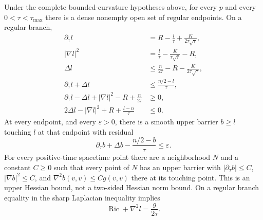 \begin{theorem}
\label{thm:m09-differential}
Under the complete bounded-curvature hypotheses above, for every $p$ and
every $0<\tau<\tau_{\max}$ there is a dense nonempty open
set of regular endpoints.  On a regular branch,
\begin{align*}
 \partial_\tau l&=R-\frac l\tau+\frac K{2\tau\sqrt\tau},\\
 |\nabla l|^2&=\frac l\tau-\frac K{\tau\sqrt\tau}-R,\\
 \Delta l&\leq\frac n{2\tau}-R-\frac K{2\tau\sqrt\tau},\\
 \partial_\tau l+\Delta l&\leq\frac{n/2-l}{\tau},\\
 \partial_\tau l-\Delta l+|\nabla l|^2-R+\frac n{2\tau}&\geq0,\\
 2\Delta l-|\nabla l|^2+R+\frac{l-n}{\tau}&\leq0.
\end{align*}
At every endpoint, and every $\varepsilon>0$, there is a smooth upper barrier
$b\geq l$ touching $l$ at that endpoint with residual
\[
 \partial_\tau b+\Delta b-\frac{n/2-b}{\tau}\leq\varepsilon .
\]
For every positive-time spacetime point there are a neighborhood $N$ and a
constant $C\geq0$ such that every point of $N$ has an upper barrier with
$|\partial_\tau b|\leq C$, $|\nabla b|^2\leq C$, and
$\nabla^2b(v,v)\leq Cg(v,v)$ there at its touching point.  This is an
upper Hessian bound, not a two-sided Hessian norm bound.  On a
regular branch equality in the sharp Laplacian inequality implies
\[
 \operatorname{Ric}+\nabla^2l=\frac{g}{2\tau}.
\]
\cite[Propositions 6.37 and 6.43, Theorem 6.50, Corollary 6.51, Propositions 6.56 and 6.59, and Proposition 7.8]{MT2007}
\end{theorem}

